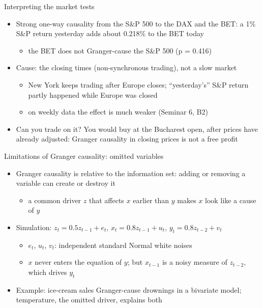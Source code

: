 \begin{frame}{Interpreting the market tests}
\itemsize{\small}
\begin{itemize}
    \item Strong one-way causality from the S\&P 500 to the DAX and the BET: a 1\% S\&P return yesterday adds about 0.218\% to the BET today
    \begin{itemize}
        \item the BET does not Granger-cause the S\&P 500 (p = 0.416)
    \end{itemize}
    \item Cause: the closing times (non-synchronous trading), not a slow market
    \begin{itemize}
        \item New York keeps trading after Europe closes; ``yesterday's'' S\&P return partly happened while Europe was closed
        \item on weekly data the effect is much weaker (Seminar 6, B2)
    \end{itemize}
    \item Can you trade on it? You would buy at the Bucharest open, after prices have already adjusted: Granger causality in closing prices is not a free profit
\end{itemize}
\end{frame}

\begin{frame}{Limitations of Granger causality: omitted variables}
\itemsize{\small}
\begin{itemize}
    \item Granger causality is relative to the information set: adding or removing a variable can create or destroy it 
    \begin{itemize}
        \item a common driver $z$ that affects $x$ earlier than $y$ makes $x$ look like a cause of $y$
    \end{itemize}
    \item Simulation: $z_t = 0.5z_{t-1} + e_t$, $x_t = 0.8z_{t-1} + u_t$, $y_t = 0.8z_{t-2} + v_t$
    \begin{itemize}
        \item $e_t$, $u_t$, $v_t$: independent standard Normal white noises
        \item $x$ never enters the equation of $y$; but $x_{t-1}$ is a noisy measure of $z_{t-2}$, which drives $y_t$
    \end{itemize}
    \item Example: ice-cream sales Granger-cause drownings in a bivariate model; temperature, the omitted driver, explains both
\end{itemize}
\end{frame}


